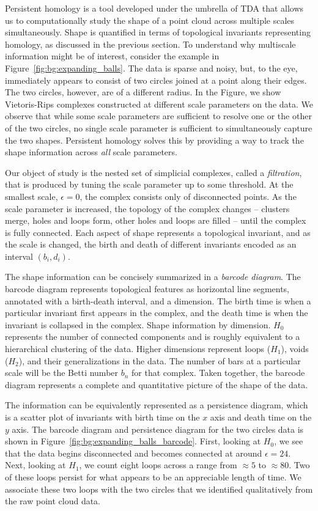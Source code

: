 Persistent homology is a tool developed under the umbrella of TDA that allows us to computationally study the shape of a point cloud across multiple scales simultaneously.
Shape is quantified in terms of topological invariants representing homology, as discussed in the previous section.
To understand why multiscale information might be of interest, consider the example in Figure~\ref{fig:bg:expanding_balls}.
The data is sparse and noisy, but, to the eye, immediately appears to consist of two circles joined at a point along their edges.
The two circles, however, are of a different radius.
In the Figure, we show Vietoris-Rips complexes constructed at different scale parameters on the data.
We observe that while some scale parameters are sufficient to resolve one or the other of the two circles, no single scale parameter is sufficient to simultaneously capture the two shapes.
Persistent homology solves this by providing a way to track the shape information across \emph{all} scale parameters.

Our object of study is the nested set of simplicial complexes, called a \emph{filtration}, that is produced by tuning the scale parameter up to some threshold.
At the smallest scale, $\epsilon=0$, the complex consists only of disconnected points.
As the scale parameter is increased, the topology of the complex changes -- clusters merge, holes and loops form, other holes and loops are filled -- until the complex is fully connected.
Each aspect of shape represents a topological invariant, and as the scale is changed, the birth and death of different invariants encoded as an interval $(b_i, d_i)$.

The shape information can be concisely summarized in a \emph{barcode diagram}.
The barcode diagram represents topological features as horizontal line segments, annotated with a birth-death interval, and a dimension.
The birth time is when a particular invariant first appears in the complex, and the death time is when the invariant is collapsed in the complex.
Shape information by dimension.
$H_0$ represents the number of connected components and is roughly equivalent to a hierarchical clustering of the data.
Higher dimensions represent loops ($H_1$), voids ($H_2$), and their generalizations in the data.
The number of bars at a particular scale will be the Betti number $b_n$ for that complex.
Taken together, the barcode diagram represents a complete and quantitative picture of the shape of the data.

The information can be equivalently represented as a persistence diagram, which is a scatter plot of invariants with birth time on the $x$ axis and death time on the $y$ axis.
The barcode diagram and persistence diagram for the two circles data is shown in Figure~\ref{fig:bg:expanding_balls_barcode}.
First, looking at $H_0$, we see that the data begins disconnected and becomes connected at around $\epsilon=24$.
Next, looking at $H_1$, we count eight loops across a range from $\approx5$ to $\approx80$.
Two of these loops persist for what appears to be an appreciable length of time.
We associate these two loops with the two circles that we identified qualitatively from the raw point cloud data.

